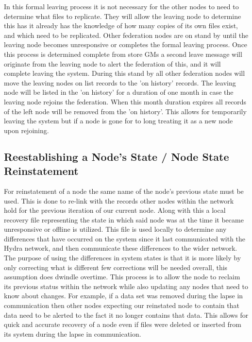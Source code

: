 In this formal leaving process it is not necessary for the other nodes to need to determine what files to replicate. They will allow the leaving node to determine this has it already has the knowledge of how many copies of its own files exist, and which need to be replicated. Other federation nodes are on stand by until the leaving node becomes unresponsive or completes the formal leaving process. Once this process is determined complete from store GMs a second leave message will originate from the leaving node to alert the federation of this, and it will complete leaving the system. During this stand by all other federation nodes will move the leaving nodes on list records to the 'on history' records. The leaving node will be listed in the 'on history' for a duration of one month in case the leaving node rejoins the federation. When this month duration expires all records of the left node will be removed from the 'on history'. This allows for temporarily leaving the system but if a node is gone for to long treating it as a new node upon rejoining.


\subsection{Reestablishing a Node's State / Node State Reinstatement}
For reinstatement of a node the same name of the node's previous state must be used. This is done to re-link with the records other nodes within the network hold for the previous iteration of our current node. Along with this a local recovery file representing the state in which said node was at the time it became unresponsive or offline is utilized. This file is used locally to determine any differences that have occurred on the system since it last communicated with the Hydra network, and then communicate these differences to the wider network. The purpose of using the differences in system states is that it is more likely by only correcting what is different few corrections will be needed overall, this assumption does dwindle overtime. This process is to allow the node to reclaim its previous status within the network while also updating any nodes that need to know about changes. For example, if a data set was removed during the lapse in communication then other nodes expecting our reinstated node to contain that data need to be alerted to the fact it no longer contains that data. This allows for quick and accurate recovery of a node even if files were deleted or inserted from its system during the lapse in communication.